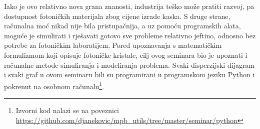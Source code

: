 \documentclass[utf8, seminar, numeric]{fer}
\begin{document}
Iako je ovo relativno nova grana znanosti, industrija teško može pratiti
razvoj, pa dostupnost fotoničkih materijala zbog cijene izrade kaska. S druge
strane, računalna moć nikad nije bila pristupačnija, a uz pomoću programskih
alata, moguće je simulirati i rješavati gotovo sve probleme relativno jeftino,
odnosno bez potrebe za fotoničkim laboratijem. Pored upoznavanja s matematičkim
formulizmom koji opisuje fotoničke kristale, cilj ovog seminara bio je upoznati i računalne metode simuliranja i modeliranja problema. Svaki disperzijski dijagram
i svaki graf u ovom seminaru bili su programirani u programskom jeziku Python i
pokrenut na osobnom računalu\footnote{
Izvorni kod nalazi se na poveznici \url{https://github.com/djanekovic/mpb_utils/tree/master/seminar/python}}.




\nocite{*}
\end{document}
